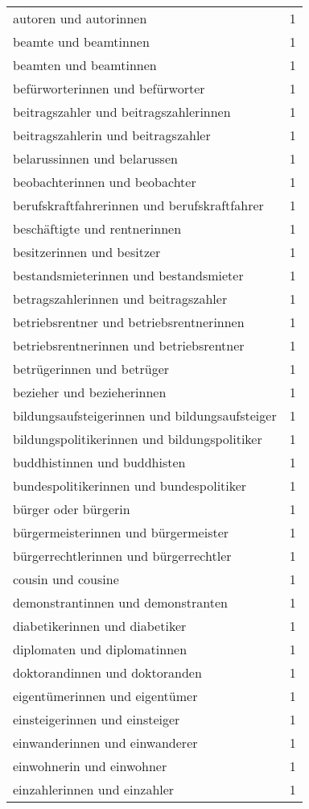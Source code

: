 \begin{tabular}{ll}
autoren und autorinnen & 1\\
beamte und beamtinnen & 1\\
beamten und beamtinnen & 1\\
befürworterinnen und befürworter & 1\\
beitragszahler und beitragszahlerinnen & 1\\
beitragszahlerin und beitragszahler & 1\\
belarussinnen und belarussen & 1\\
beobachterinnen und beobachter & 1\\
berufskraftfahrerinnen und berufskraftfahrer & 1\\
beschäftigte und rentnerinnen & 1\\
besitzerinnen und besitzer & 1\\
bestandsmieterinnen und bestandsmieter & 1\\
betragszahlerinnen und beitragszahler & 1\\
betriebsrentner und betriebsrentnerinnen & 1\\
betriebsrentnerinnen und betriebsrentner & 1\\
betrügerinnen und betrüger & 1\\
bezieher und bezieherinnen & 1\\
bildungsaufsteigerinnen und bildungsaufsteiger & 1\\
bildungspolitikerinnen und bildungspolitiker & 1\\
buddhistinnen und buddhisten & 1\\
bundespolitikerinnen und bundespolitiker & 1\\
bürger oder bürgerin & 1\\
bürgermeisterinnen und bürgermeister & 1\\
bürgerrechtlerinnen und bürgerrechtler & 1\\
cousin und cousine & 1\\
demonstrantinnen und demonstranten & 1\\
diabetikerinnen und diabetiker & 1\\
diplomaten und diplomatinnen & 1\\
doktorandinnen und doktoranden & 1\\
eigentümerinnen und eigentümer & 1\\
einsteigerinnen und einsteiger & 1\\
einwanderinnen und einwanderer & 1\\
einwohnerin und einwohner & 1\\
einzahlerinnen und einzahler & 1\\

\end{tabular}

